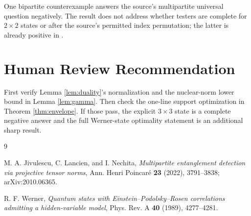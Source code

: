 \documentclass[11pt]{amsart}
\begin{document}
One bipartite counterexample answers the source's multipartite universal
question negatively.  The result does not address whether testers are
complete for $2\times2$ states or after the source's permitted index
permutation; the latter is already positive in \cite{JLN}.

\section*{Human Review Recommendation}

First verify Lemma \ref{lem:duality}'s normalization and the nuclear-norm
lower bound in Lemma \ref{lem:gamma}.  Then check the one-line support
optimization in Theorem \ref{thm:envelope}.  If those pass, the explicit
$3\times3$ state is a complete negative answer and the full Werner-state
optimality statement is an additional sharp result.

\begin{thebibliography}{9}

M. A. Jivulescu, C. Lancien, and I. Nechita,
\emph{Multipartite entanglement detection via projective tensor norms},
Ann. Henri Poincar\'e \textbf{23} (2022), 3791--3838;
arXiv:2010.06365.

R. F. Werner,
\emph{Quantum states with Einstein--Podolsky--Rosen correlations admitting a
hidden-variable model},
Phys. Rev. A \textbf{40} (1989), 4277--4281.

\end{thebibliography}
\end{document}
